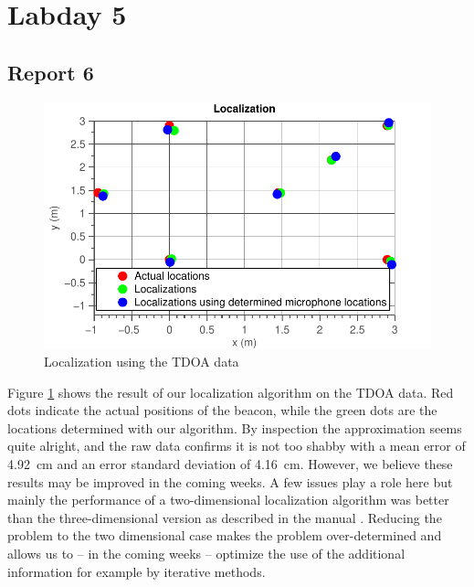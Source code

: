 \documentclass[11pt,titlepage]{report}
\begin{document}
\section{Labday 5}
\subsection{Report 6}
\begin{figure}[H]
	\begin{center}
		\includegraphics[width=.8\linewidth]{../../deliverable-7-resources/figures/ass-2/report-6/ass-2-report-6.pdf}
	\end{center}
	\caption{Localization using the TDOA data}
	\label{fig:ass-2-rep-6}
\end{figure}
Figure \ref{fig:ass-2-rep-6} shows the result of our localization algorithm on the TDOA data. Red dots indicate the actual positions of the beacon, while the green dots are the locations determined with our algorithm. By inspection the approximation seems quite alright, and the raw data confirms it is not too shabby with a mean error of \SI{4.92}{\centi\meter} and an error standard deviation of \SI{4.16}{\centi\meter}. However, we believe these results may be improved in the coming weeks. A few issues play a role here but mainly the performance of a two-dimensional localization algorithm was better than the three-dimensional version as described in the manual \cite{epo4-manual}. Reducing the problem to the two dimensional case makes the problem over-determined and allows us to -- in the coming weeks -- optimize the use of the additional information for example by iterative methods. 
\end{document}
